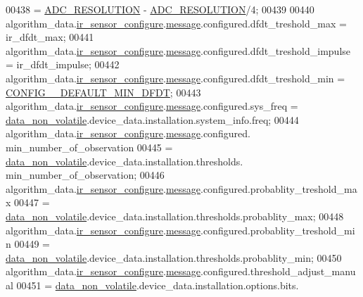 \begin{DoxyCode}
{{{{{00438                                          = \hyperlink{a00058_a00978ca9e8220475258dcbbbb7d29129}{ADC\_RESOLUTION} - 
      \hyperlink{a00058_a00978ca9e8220475258dcbbbb7d29129}{ADC\_RESOLUTION}/4;
00439 
00440     algorithm\_data.\hyperlink{a00016_ac6483a3473f539f671660ae458d889d3}{ir\_sensor\_configure}.\hyperlink{a00018_a32952acc732e2f16aad59fe0804da5bf}{message}.configured.dfdt\_treshold\_max      
         = ir\_dfdt\_max;
00441     algorithm\_data.\hyperlink{a00016_ac6483a3473f539f671660ae458d889d3}{ir\_sensor\_configure}.\hyperlink{a00018_a32952acc732e2f16aad59fe0804da5bf}{message}.configured.dfdt\_treshold\_impulse  
         = ir\_dfdt\_impulse;
00442     algorithm\_data.\hyperlink{a00016_ac6483a3473f539f671660ae458d889d3}{ir\_sensor\_configure}.\hyperlink{a00018_a32952acc732e2f16aad59fe0804da5bf}{message}.configured.dfdt\_treshold\_min      
         = \hyperlink{a00021_a0eae7c540b766617bb00f79cd63415a2}{CONFIG\_\_DEFAULT\_MIN\_DFDT};
00443     algorithm\_data.\hyperlink{a00016_ac6483a3473f539f671660ae458d889d3}{ir\_sensor\_configure}.\hyperlink{a00018_a32952acc732e2f16aad59fe0804da5bf}{message}.configured.sys\_freq               
         = \hyperlink{a00060_a76ac5f917f5308dcd83de0d7c94559fb}{data\_non\_volatile}.device\_data.installation.system\_info.freq;
00444     algorithm\_data.\hyperlink{a00016_ac6483a3473f539f671660ae458d889d3}{ir\_sensor\_configure}.\hyperlink{a00018_a32952acc732e2f16aad59fe0804da5bf}{message}.configured.
      min\_number\_of\_observation
00445                    = \hyperlink{a00060_a76ac5f917f5308dcd83de0d7c94559fb}{data\_non\_volatile}.device\_data.installation.thresholds.
      min\_number\_of\_observation;
00446     algorithm\_data.\hyperlink{a00016_ac6483a3473f539f671660ae458d889d3}{ir\_sensor\_configure}.\hyperlink{a00018_a32952acc732e2f16aad59fe0804da5bf}{message}.configured.probablity\_treshold\_max
00447                    = \hyperlink{a00060_a76ac5f917f5308dcd83de0d7c94559fb}{data\_non\_volatile}.device\_data.installation.thresholds.probablity\_max;
00448     algorithm\_data.\hyperlink{a00016_ac6483a3473f539f671660ae458d889d3}{ir\_sensor\_configure}.\hyperlink{a00018_a32952acc732e2f16aad59fe0804da5bf}{message}.configured.probablity\_treshold\_min
00449                    = \hyperlink{a00060_a76ac5f917f5308dcd83de0d7c94559fb}{data\_non\_volatile}.device\_data.installation.thresholds.probablity\_min;
00450     algorithm\_data.\hyperlink{a00016_ac6483a3473f539f671660ae458d889d3}{ir\_sensor\_configure}.\hyperlink{a00018_a32952acc732e2f16aad59fe0804da5bf}{message}.configured.threshold\_adjust\_manual
00451                    = \hyperlink{a00060_a76ac5f917f5308dcd83de0d7c94559fb}{data\_non\_volatile}.device\_data.installation.options.bits.
}}}}}
\end{DoxyCode}
